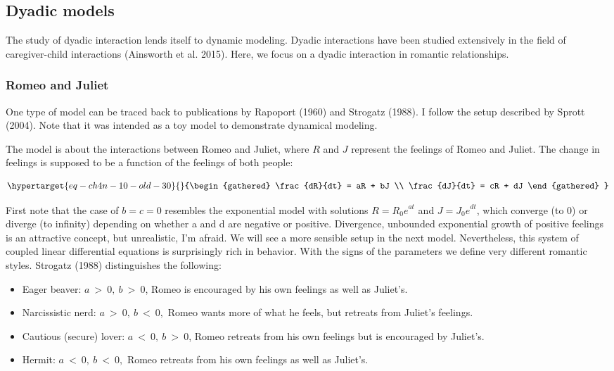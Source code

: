 \documentclass[
  a4paper,
  DIV=11,
  numbers=noendperiod,
  oneside]{scrreprt}
\begin{document}
\hypertarget{sec-Dyadic-models}{%
\subsection{Dyadic models}\label{sec-Dyadic-models}}

The study of dyadic interaction lends itself to dynamic modeling. Dyadic
interactions have been studied extensively in the field of
caregiver-child interactions (Ainsworth et al. 2015). Here, we focus on
a dyadic interaction in romantic relationships.

\hypertarget{sec-Romeo-and-Juliet}{%
\subsubsection{Romeo and Juliet}\label{sec-Romeo-and-Juliet}}

One type of model can be traced back to publications by Rapoport (1960)
and Strogatz (1988). I follow the setup described by Sprott (2004). Note
that it was intended as a toy model to demonstrate dynamical modeling.

The model is about the interactions between Romeo and Juliet, where
\(R\) and \(J\) represent the feelings of Romeo and Juliet. The change
in feelings is supposed to be a function of the feelings of both people:

\begin{equation}\protect\hypertarget{eq-ch4n-10-old-30}{}{\begin{gathered}
\frac{dR}{dt} = aR + bJ \\
\frac{dJ}{dt} = cR + dJ
\end{gathered}
}\label{eq-ch4n-10-old-30}\end{equation}

First note that the case of \(b = c = 0\) resembles the exponential
model with solutions \(R = {R_{0}e}^{at}\) and \(J = {J_{0}e}^{dt}\),
which converge (to 0) or diverge (to infinity) depending on whether a
and d are negative or positive. Divergence, unbounded exponential growth
of positive feelings is an attractive concept, but unrealistic, I'm
afraid. We will see a more sensible setup in the next model.
Nevertheless, this system of coupled linear differential equations is
surprisingly rich in behavior. With the signs of the parameters we
define very different romantic styles. Strogatz (1988) distinguishes the
following:

\begin{itemize}
\item
  Eager beaver: \(a\  > \ 0,\ b\  > \ 0\), Romeo is encouraged by his
  own feelings as well as Juliet's.
\item
  Narcissistic nerd: \(a\  > \ 0,\ b\  < \ 0,\) Romeo wants more of what
  he feels, but retreats from Juliet's feelings.
\item
  Cautious (secure) lover: \(a\  < \ 0,\ b\  > \ 0\), Romeo retreats
  from his own feelings but is encouraged by Juliet's.
\item
  Hermit: \(a\  < \ 0,\ b\  < \ 0,\) Romeo retreats from his own
  feelings as well as Juliet's.
\end{itemize}
\end{document}

